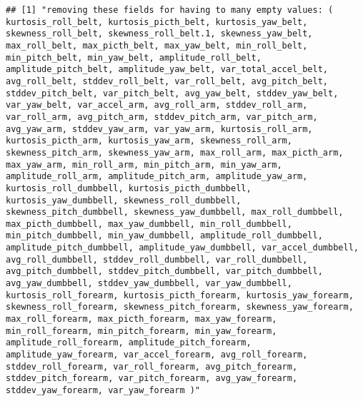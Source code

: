 \documentclass[]{article}
\newenvironment{Shaded}{\begin{snugshade}}{\end{snugshade}}
\newcommand{\KeywordTok}[1]{\textcolor[rgb]{0.13,0.29,0.53}{\textbf{#1}}}
\newcommand{\StringTok}[1]{\textcolor[rgb]{0.31,0.60,0.02}{#1}}
\newcommand{\CommentTok}[1]{\textcolor[rgb]{0.56,0.35,0.01}{\textit{#1}}}
\newcommand{\OperatorTok}[1]{\textcolor[rgb]{0.81,0.36,0.00}{\textbf{#1}}}
\newcommand{\NormalTok}[1]{#1}
\begin{document}
\begin{verbatim}
## [1] "removing these fields for having to many empty values: ( kurtosis_roll_belt, kurtosis_picth_belt, kurtosis_yaw_belt, skewness_roll_belt, skewness_roll_belt.1, skewness_yaw_belt, max_roll_belt, max_picth_belt, max_yaw_belt, min_roll_belt, min_pitch_belt, min_yaw_belt, amplitude_roll_belt, amplitude_pitch_belt, amplitude_yaw_belt, var_total_accel_belt, avg_roll_belt, stddev_roll_belt, var_roll_belt, avg_pitch_belt, stddev_pitch_belt, var_pitch_belt, avg_yaw_belt, stddev_yaw_belt, var_yaw_belt, var_accel_arm, avg_roll_arm, stddev_roll_arm, var_roll_arm, avg_pitch_arm, stddev_pitch_arm, var_pitch_arm, avg_yaw_arm, stddev_yaw_arm, var_yaw_arm, kurtosis_roll_arm, kurtosis_picth_arm, kurtosis_yaw_arm, skewness_roll_arm, skewness_pitch_arm, skewness_yaw_arm, max_roll_arm, max_picth_arm, max_yaw_arm, min_roll_arm, min_pitch_arm, min_yaw_arm, amplitude_roll_arm, amplitude_pitch_arm, amplitude_yaw_arm, kurtosis_roll_dumbbell, kurtosis_picth_dumbbell, kurtosis_yaw_dumbbell, skewness_roll_dumbbell, skewness_pitch_dumbbell, skewness_yaw_dumbbell, max_roll_dumbbell, max_picth_dumbbell, max_yaw_dumbbell, min_roll_dumbbell, min_pitch_dumbbell, min_yaw_dumbbell, amplitude_roll_dumbbell, amplitude_pitch_dumbbell, amplitude_yaw_dumbbell, var_accel_dumbbell, avg_roll_dumbbell, stddev_roll_dumbbell, var_roll_dumbbell, avg_pitch_dumbbell, stddev_pitch_dumbbell, var_pitch_dumbbell, avg_yaw_dumbbell, stddev_yaw_dumbbell, var_yaw_dumbbell, kurtosis_roll_forearm, kurtosis_picth_forearm, kurtosis_yaw_forearm, skewness_roll_forearm, skewness_pitch_forearm, skewness_yaw_forearm, max_roll_forearm, max_picth_forearm, max_yaw_forearm, min_roll_forearm, min_pitch_forearm, min_yaw_forearm, amplitude_roll_forearm, amplitude_pitch_forearm, amplitude_yaw_forearm, var_accel_forearm, avg_roll_forearm, stddev_roll_forearm, var_roll_forearm, avg_pitch_forearm, stddev_pitch_forearm, var_pitch_forearm, avg_yaw_forearm, stddev_yaw_forearm, var_yaw_forearm )"
\end{verbatim}

\begin{Shaded}
\end{Shaded}
\end{document}
